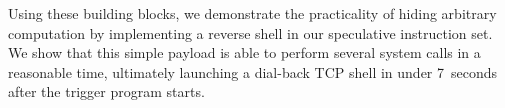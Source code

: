 Using these building blocks, we demonstrate the practicality of hiding arbitrary
computation by implementing a reverse shell in our speculative instruction set.
We show that this simple payload is able to perform several system calls
in a reasonable time, ultimately launching a dial-back TCP shell in under 7~seconds after
the trigger program starts.










